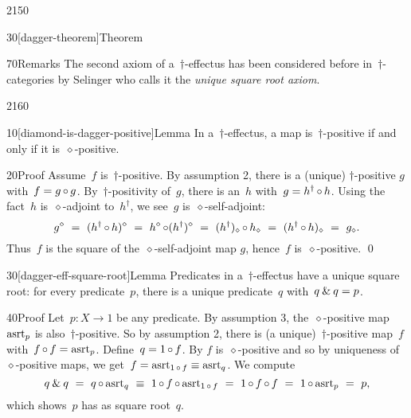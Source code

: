 \begin{parsec}{2150}
\begin{point}{30}[dagger-theorem]{Theorem}
\begin{point}{70}{Remarks}
The second axiom of a~$\dagger$-effectus
    has been considered before in~$\dagger$-categories
    by Selinger \cite{selinger2008idempotents}
    who calls it the \emph{unique square root axiom}.
\end{point}
\end{point}
\end{parsec}


\begin{parsec}{2160}%
\begin{point}{10}[diamond-is-dagger-positive]{Lemma}%
In a~$\dagger$-effectus,
    a map is~$\dagger$-positive if and only if it is~$\diamond$-positive.
\begin{point}{20}{Proof}%
Assume~$f$ is~$\dagger$-positive.
By assumption 2, there is a (unique) $\dagger$-positive
    $g$ with~$f = g \mathop{\circ} g$.
By~$\dagger$-positivity of~$g$,
    there is an~$h$ with~$g = h^\dagger \mathop{\circ} h$.
Using the fact~$h$ is~$\diamond$-adjoint
    to~$h^\dagger$, we see~$g$ is~$\diamond$-self-adjoint:
\begin{equation*}
    g^\diamond
    \ =\  (h^\dagger \mathop{\circ} h)^\diamond
    \ =\  h^\diamond \mathop{\circ} (h^\dagger)^\diamond 
    \ =\  (h^\dagger)_\diamond \mathop{\circ} h_\diamond 
    \ =\  (h^\dagger\mathop{\circ} h)_\diamond
    \ =\  g_\diamond.
\end{equation*}
Thus~$f$ is the square of the~$\diamond$-self-adjoint map $g$,
    hence~$f$ is~$\diamond$-positive. \qed
\end{point}
\end{point}

\begin{point}{30}[dagger-eff-square-root]{Lemma}%
Predicates in a~$\dagger$-effectus have a unique square root:
    for every predicate~$p$,
    there is a unique predicate~$q$
    with~$q \mathbin{\&} q=p$.
\begin{point}{40}{Proof}%
Let~$p\colon X \to 1$ be any predicate.
By assumption 3,
    the~$\diamond$-positive map~$\mathrm{asrt}_p$
        is also~$\dagger$-positive.
So by assumption 2,
    there is (a unique)~$\dagger$-positive map~$f$
    with~$f \mathop{\circ} f = \mathrm{asrt}_p$.
Define~$q = 1 \mathop{\circ} f$.
By 
    $f$ is~$\diamond$-positive
    and so by uniqueness of~$\diamond$-positive maps,
    we get~$f = \mathrm{asrt}_{1\mathop{\circ} f} \equiv \mathrm{asrt}_q$.
We compute
\begin{equation*}
    \andthen{q}{q}
        \ =\    
        q \after \asrt_q \ \equiv \ 
        1 \after f \after \asrt_{1 \after f} \ = \ 
        1 \after f \after f \ = \ 1 \after \asrt_p \ = \ p,
\end{equation*}
which shows~$p$ has as square root~$q$.


\end{point}
\end{point}
\end{parsec}
